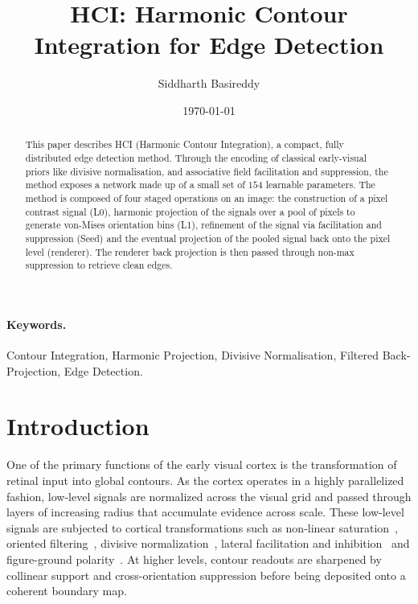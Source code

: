 \documentclass[11pt,a4paper]{article}
\title{HCI: Harmonic Contour Integration for Edge Detection}
\author{%
  Siddharth Basireddy%
}
\date{\today}
\begin{document}
\maketitle

\begin{abstract}
This paper describes HCI (Harmonic Contour Integration), a compact, fully distributed edge detection method. Through the encoding of classical early-visual priors like divisive normalisation, and associative field facilitation and suppression, the method exposes a network made up of a small set of $154$ learnable parameters. The method is composed of four staged operations on an image: the construction of a pixel contrast signal (L0), harmonic projection of the signals over a pool of pixels to generate von-Mises orientation bins (L1), refinement of the signal via facilitation and suppression (Seed) and the eventual projection of the pooled signal back onto the pixel level (renderer). The renderer back projection is then passed through non-max suppression to retrieve clean edges.
\end{abstract}

\paragraph{Keywords.} Contour Integration, Harmonic Projection, Divisive Normalisation, Filtered Back-Projection, Edge Detection.

\section{Introduction}\label{sec:intro}

One of the primary functions of the early visual cortex is the transformation of retinal input into global contours. As the cortex operates in a highly parallelized fashion, low-level signals are normalized across the visual grid and passed through layers of increasing radius that accumulate evidence across scale. These low-level signals are subjected to cortical transformations such as non-linear saturation~\cite{naka1966srod}, oriented filtering~\cite{hubel1962orientation}, divisive normalization~\cite{heeger1992normalisation,cavanaugh2002surround}, lateral facilitation and inhibition~\cite{kapadia1995dynamics,field1993contour} and figure-ground polarity~\cite{zhou2000border}. At higher levels, contour readouts are sharpened by collinear support and cross-orientation suppression before being deposited onto a coherent boundary map.
\end{document}
